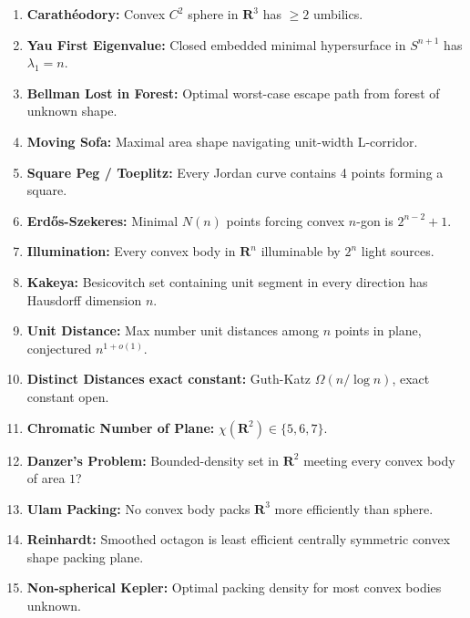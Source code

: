 \documentclass[aps,prd,amsmath,amssymb,twocolumn,superscriptaddress]{revtex4-2}
\begin{document}
\begin{enumerate}[label={\bf \arabic*.}, leftmargin=*, itemsep=2pt]
\item \textbf{Carath\'eodory:} Convex $C^2$ sphere in $\mathbf R^3$ has $\ge2$ umbilics.

\item \textbf{Yau First Eigenvalue:} Closed embedded minimal hypersurface in $S^{n+1}$ has $\lambda_1=n$.

\item \textbf{Bellman Lost in Forest:} Optimal worst-case escape path from forest of unknown shape.

\item \textbf{Moving Sofa:} Maximal area shape navigating unit-width L-corridor.

\item \textbf{Square Peg / Toeplitz:} Every Jordan curve contains 4 points forming a square.

\item \textbf{Erd\H{o}s-Szekeres:} Minimal $N(n)$ points forcing convex $n$-gon is $2^{n-2}+1$.

\item \textbf{Illumination:} Every convex body in $\mathbf R^n$ illuminable by $2^n$ light sources.

\item \textbf{Kakeya:} Besicovitch set containing unit segment in every direction has Hausdorff dimension $n$.

\item \textbf{Unit Distance:} Max number unit distances among $n$ points in plane, conjectured $n^{1+o(1)}$.

\item \textbf{Distinct Distances exact constant:} Guth-Katz $\Omega(n/\log n)$, exact constant open.

\item \textbf{Chromatic Number of Plane:} $\chi(\mathbf R^2)\in\{5,6,7\}$.

\item \textbf{Danzer's Problem:} Bounded-density set in $\mathbf R^2$ meeting every convex body of area $1$?

\item \textbf{Ulam Packing:} No convex body packs $\mathbf R^3$ more efficiently than sphere.

\item \textbf{Reinhardt:} Smoothed octagon is least efficient centrally symmetric convex shape packing plane.

\item \textbf{Non-spherical Kepler:} Optimal packing density for most convex bodies unknown.


\end{enumerate}
\end{document}
